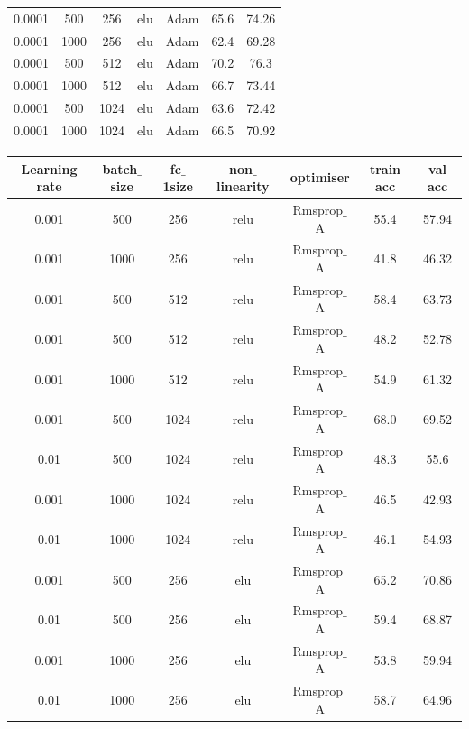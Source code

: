 \documentclass[12pt]{report}
\begin{document}
\begin{table}[H]
\begin{center}
\begin{tabular}{| c | c | c | c | c | c | c |}
            0.0001 & 500 & 256 & elu & Adam & 65.6 & 74.26 \\
            0.0001 & 1000 & 256 & elu & Adam & 62.4 & 69.28 \\
            0.0001 & 500 & 512 & elu & Adam & 70.2 & 76.3 \\
            0.0001 & 1000 & 512 & elu & Adam & 66.7 & 73.44 \\
            0.0001 & 500 & 1024 & elu & Adam & 63.6 & 72.42 \\
            0.0001 & 1000 & 1024 & elu & Adam & 66.5 & 70.92 \\
           \hline
		\end{tabular}
	\end{center}
\end{table}

\begin{table}[H]
	\label{T:equipos}
	\begin{center}
		\begin{tabular}{| c | c | c | c | c | c | c |}
			\hline
			\textbf{Learning rate} & \textbf{batch$\_$size} & \textbf{fc$\_$1size} & \textbf{non$\_$linearity} & \textbf{optimiser} & \textbf{train acc} & \textbf{val acc}\\ 
			\hline
            0.001 & 500 & 256 & relu & Rmsprop$\_$A & 55.4 & 57.94\\
            0.001 & 1000 & 256 & relu & Rmsprop$\_$A & 41.8 & 46.32\\
            0.001 & 500 & 512 & relu & Rmsprop$\_$A & 58.4 & 63.73\\
            0.001 & 500 & 512 & relu & Rmsprop$\_$A & 48.2 & 52.78\\
            0.001 & 1000 & 512 & relu & Rmsprop$\_$A & 54.9 & 61.32\\
            0.001 & 500 & 1024 & relu & Rmsprop$\_$A & 68.0 & 69.52\\
            0.01 & 500 & 1024 & relu & Rmsprop$\_$A & 48.3 & 55.6\\
            0.001 & 1000 & 1024 & relu & Rmsprop$\_$A & 46.5 & 42.93\\
            0.01 & 1000 & 1024 & relu & Rmsprop$\_$A & 46.1 & 54.93\\
            0.001 & 500 & 256 & elu & Rmsprop$\_$A & 65.2 & 70.86\\
            0.01 & 500 & 256 & elu & Rmsprop$\_$A & 59.4 & 68.87\\
            0.001 & 1000 & 256 & elu & Rmsprop$\_$A & 53.8 & 59.94\\
            0.01 & 1000 & 256 & elu & Rmsprop$\_$A & 58.7 & 64.96\\

\end{tabular}
\end{center}
\end{table}
\end{document}
